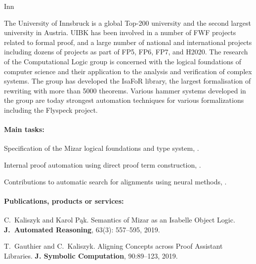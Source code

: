 \begin{sitedescription}{Inn}

The University of Innsbruck is a global Top-200 university and the second
largest university in Austria. UIBK has been involved in a number of FWF
projects related to formal proof, and a large number of national and
international projects including dozens of projects as part of FP5,
FP6, FP7, and H2020.
%
The research of the Computational Logic group is concerned with the logical
foundations of computer science and their application to the analysis and
verification of complex systems. The group has developed the IsaFoR library,
the largest formalisation of rewriting with more than 5000 theorems. Various
hammer systems developed in the group are today strongest automation techniques
for various formalizations including the Flyspeck project.

\paragraph*{Main tasks:}

\begin{compactitem}
\item Specification of the Mizar logical foundations and type system,  .
\item Internal proof automation using direct proof term construction, %
   .
\item Contributions to automatic search for alignments using neural methods,  .
\end{compactitem}

\paragraph*{Publications, products or services:}
\begin{compactitem}
\item
C.~Kaliszyk and Karol Pąk.
\newblock Semantics of Mizar as an Isabelle Object Logic.
\textbf{J.~Automated Reasoning}, 63(3): 557--595, 2019.

\item
T.~Gauthier and C.~Kaliszyk.
\newblock Aligning Concepts across Proof Assistant Libraries.
\textbf{J. Symbolic Computation}, 90:89--123, 2019.


\end{compactitem}
\end{sitedescription}
